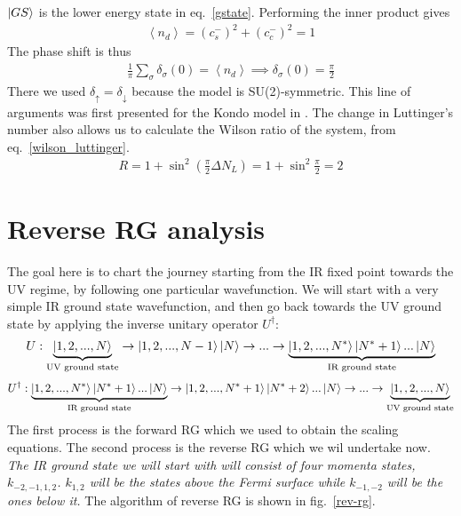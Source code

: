 \documentclass[12pt,twoside]{report}
\numberwithin{equation}{section}
\begin{document}
\(\ket{GS}\) is the lower energy state in eq.~\ref{gstate}. Performing the inner product gives
\begin{equation}\begin{aligned}
	\left<n_d \right> = \left( c_s^- \right)^2 + \left( c_c^- \right)^2 = 1
\end{aligned}\end{equation}
The phase shift is thus
\begin{equation}\begin{aligned}
	\frac{1}{\pi}\sum_\sigma \delta_\sigma(0) = \left<n_d \right> \implies \delta_\sigma(0) = \frac{\pi}{2}
\end{aligned}\end{equation}
There we used \(\delta_\uparrow = \delta_\downarrow\) because the model is SU(2)-symmetric. This line of arguments was first presented for the Kondo model in \cite{martin}.
\pb The change in Luttinger's number also allows us to calculate the Wilson ratio of the system, from eq.~\ref{wilson_luttinger}.
\begin{equation}\begin{aligned}
	R = 1 + \sin^2 \left( \frac{\pi}{2}\Delta N_L \right) = 1 + \sin^2 \frac{\pi}{2} = 2
\end{aligned}\end{equation}
\section{Reverse RG analysis}
The goal here is to chart the journey starting from the IR fixed point towards the UV regime, by following one particular wavefunction. We will start with a very simple IR ground state wavefunction, and then go back towards the UV ground state by applying the inverse unitary operator \(U^\dagger\):
\begin{equation*}\begin{aligned}
	U : \underbrace{\ket{1,2,...,N}}_\text{UV ground state} \rightarrow \ket{1,2,...,N-1}\ket{N} \rightarrow ... \rightarrow \underbrace{\ket{1,2,...,N^*}\ket{N^*+1}...\ket{N}}_\text{IR ground state}
\end{aligned}\end{equation*}
\begin{equation*}\begin{aligned}
	U^\dagger : \underbrace{\ket{1,2,...,N^*}\ket{N^*+1}...\ket{N}}_\text{IR ground state} \rightarrow \ket{1,2,...,N^*+1}\ket{N^*+2}...\ket{N} \rightarrow ... \rightarrow\underbrace{\ket{1,,2,...,N}}_\text{UV ground state}
\end{aligned}\end{equation*}
The first process is the forward RG which we used to obtain the scaling equations. The second process is the reverse RG which we wil undertake now. \textit{The IR ground state we will start with will consist of four momenta states, \(k_{-2, -1, 1 ,2}\). \(k_{1,2}\) will be the states above the Fermi surface while \(k_{-1, -2}\) will be the ones below it.} The algorithm of reverse RG is shown in fig.~\ref{rev-rg}.
\end{document}
